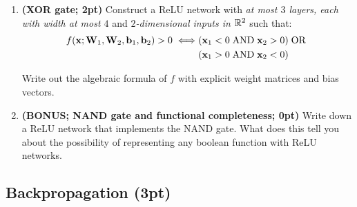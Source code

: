 \documentclass[12pt,letterpaper]{article}
\begin{document}
\begin{enumerate}
\begin{enumerate}
       \item \textbf{(XOR gate; 2pt)} Construct a ReLU network with \emph{at most $3$ layers, each with width at most $4$} and \emph{$2$-dimensional inputs in $\mathbb{R}^2$}  such that: \begin{align}
           f({\mathbf{x}}; {\mathbf{W}}_1, {\mathbf{W}}_2, {\mathbf{b}}_1, {\mathbf{b}}_2) > 0 \iff 
           & ({\mathbf{x}}_1 < 0 \mathrel{\mathrm{AND}} {\mathbf{x}}_2 > 0) \mathrel{\mathrm{OR}} {} \notag\\
           & ({\mathbf{x}}_1 > 0 \mathrel{\mathrm{AND}} {\mathbf{x}}_2 < 0)
       \end{align}
       
       Write out the algebraic formula of $f$ with explicit weight matrices and bias vectors.
       


       
       \item \textbf{(BONUS; NAND gate and functional completeness; 0pt)} Write down a ReLU network that implements the NAND gate. What does this tell you about the possibility of representing any boolean function with ReLU networks.
       
   \end{enumerate} 
\end{enumerate}

\vspace{-0.2in}
\subsection*{Backpropagation (3pt)}
\end{document}
